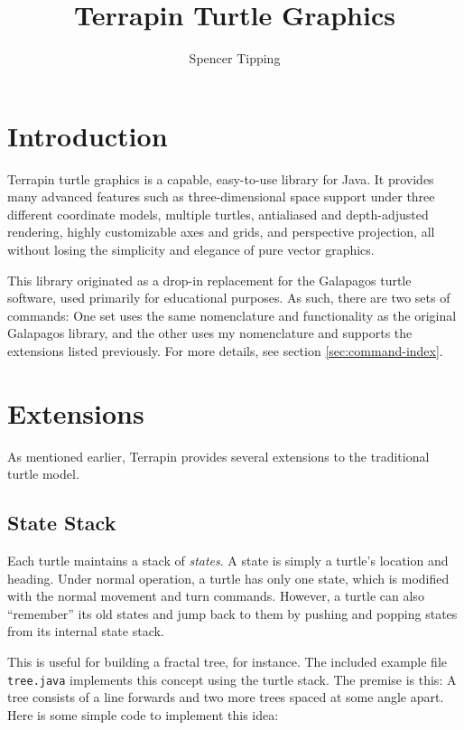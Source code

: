 \documentclass{article}
\begin{document}
  \title{Terrapin Turtle Graphics}
  \author{Spencer Tipping}
  \date{}
  \maketitle

  \tableofcontents

  \section{Introduction}
    \label{sec:introduction}

    Terrapin turtle graphics is a capable, easy-to-use library for Java. It
    provides many advanced features such as three-dimensional space support
    under three different coordinate models, multiple turtles, antialiased and
    depth-adjusted rendering, highly customizable axes and grids, and
    perspective projection, all without losing the simplicity and elegance of
    pure vector graphics.

    This library originated as a drop-in replacement for the Galapagos turtle
    software, used primarily for educational purposes. As such, there are two
    sets of commands: One set uses the same nomenclature and functionality as
    the original Galapagos library, and the other uses my nomenclature and
    supports the extensions listed previously. For more details, see section
    \ref{sec:command-index}.

  \section{Extensions}
    \label{sec:extensions}

    As mentioned earlier, Terrapin provides several extensions to the
    traditional turtle model.

    \subsection{State Stack}
      \label{sec:state-stack}

      Each turtle maintains a stack of {\em states}. A state is simply a
      turtle's location and heading. Under normal operation, a turtle has only
      one state, which is modified with the normal movement and turn commands.
      However, a turtle can also ``remember'' its old states and jump back to
      them by pushing and popping states from its internal state stack.

      This is useful for building a fractal tree, for instance. The included
      example file \verb|tree.java| implements this concept using the turtle
      stack. The premise is this: A tree consists of a line forwards and two
      more trees spaced at some angle apart. Here is some simple code to
      implement this idea:
\end{document}
